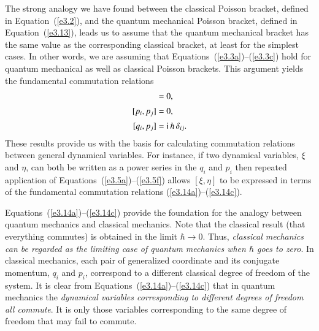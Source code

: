 The strong analogy we have found between the classical Poisson bracket, defined
in Equation~(\ref{e3.2}), and the quantum mechanical 
Poisson bracket, defined in Equation~(\ref{e3.13}), leads
us to  assume that the quantum mechanical bracket has the same
value as the corresponding classical bracket, at least for the simplest
cases. In other words, we are assuming that Equations~(\ref{e3.3a})--(\ref{e3.3c}) hold for quantum
mechanical as well as classical Poisson brackets. This argument yields the
fundamental commutation relations
\begin{align}
[q_i, q_j] &= 0,\label{e3.14a}\\[0.5ex]
[p_i, p_j]&= 0, \label{e3.14b}\\[0.5ex]
[q_i, p_j] &= {\rm i} \,\hbar \,\delta_{ij}.\label{e3.14c}
\end{align}
These results provide us with the basis for calculating commutation
relations between general dynamical variables. For instance, if
two dynamical variables,  $\xi$ and $\eta$,
can both  be written as a power series in the
 $q_i$ and $p_i$ then repeated application of Equations~(\ref{e3.5a})--(\ref{e3.5f})
allows $[\xi, \eta]$ to be expressed in terms of the fundamental
commutation relations (\ref{e3.14a})--(\ref{e3.14c}). 

Equations~(\ref{e3.14a})--(\ref{e3.14c}) provide the foundation for the analogy between quantum mechanics
and classical mechanics. Note that the classical result (that everything commutes)
is obtained in the limit $\hbar\rightarrow 0$. Thus, {\em classical mechanics
can be regarded as the limiting case of quantum mechanics when
$\hbar$ goes to zero}. 
In classical mechanics, each 
pair of generalized coordinate and its conjugate momentum, $q_i$ and
$p_i$, correspond to a different classical degree of freedom of the system. 
It is clear from Equations~(\ref{e3.14a})--(\ref{e3.14c}) that in quantum mechanics the {\em dynamical
variables corresponding to different degrees of freedom all commute}. 
It is only those variables corresponding to the same degree of freedom that 
may fail to commute.

